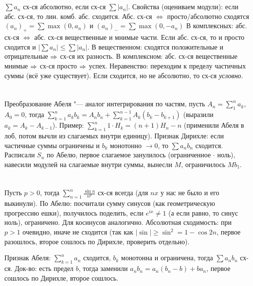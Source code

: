 \section{} %
$\sum a_n$ сх-ся абсолютно, если сх-ся $\sum |a_n|$.
Свойства (оцениваем модули): если абс. сх-ся, то лин. комб. абс. сходится.
Абс. сх-ся $\iff$ просто/абсолютно сходятся $(a_n)_+ = \sum \max(0, a_n)$ и $(a_n)_- = \sum \max(0, -a_n)$
В комплексных: абс. сх-ся $\iff$ абс. сх-ся вещественные и мнимые части.
Если абс. сх-ся, то и просто сходится и $|\sum a_n| \le \sum |a_n|$.
В вещественном: сходятся положительные и отрицательные $\Rightarrow$ сх-ся их разность.
В комплексном: абс. сх-ся вещественные мнимые $\Rightarrow$ сх-ся просто $\Rightarrow$ успех.
Неравенство: переходим к пределу частичных суммы (всё уже существует).
Если сходится, но не абсолютно, то сх-ся \textit{условно}.

\section{} %
Преобразование Абеля "--- аналог интегрирования по частям, пусть $A_n = \sum_1^n a_k$, $A_0=0$,
тогда $\sum_{k=1}^n a_kb_k = A_nb_n + \sum_{k=1}^{n-1} A_k(b_k-b_{k+1})$ (выразили $a_k=A_k-A_{k-1}$).
Пример: $\sum_{k=1}^n 1\cdot H_k = (n+1)H_n-n$ (применили Абеля в лоб, потом вычли из слагаемых внутри единицу).
Признак Дирихле: если частичные суммы ограничены и $b_k$ монотонно $\to 0$, то $\sum a_nb_n$ сходится.
Расписали $S_n$ по Абелю, первое слагаемое занулилось (ограниченное $\cdot$ ноль), навесили модулей на слагаемые
внутри суммы, вынесли $M$, ограничилось $Mb_1$.

\section{} %
Пусть $p>0$, тогда $\sum_{n=1}^n \frac{\sin n}{n^p}$ сх-ся всегда (для $nx$ у нас не было и его выкинули).
По Абелю: посчитали сумму синусов (как геометрическую прогрессию ешки), получилось поделить,
если $e^{ix}\neq 1$ (а если равно, то синус ноль), ограничено.
Для косинусов аналогично.
Абсолютная сходимость: при $p>1$ очевидно, иначе не сходится (так как $|\sin|\ge \sin^2 = 1-\cos 2n$, первое
разошлось, второе сошлось по Дирихле, проверить отдельно).

Признак Абеля: $\sum_{k=1}^n a_n$ сходится, $b_k$ монотонна и ограничена, тогда $\sum a_nb_n$ сх-ся.
Док-во: есть предел $b$, тогда заменили $a_nb_n = a_n(b_n - b) + ba_n$, первое сошлось по Дирихле,
второе сошлось.

